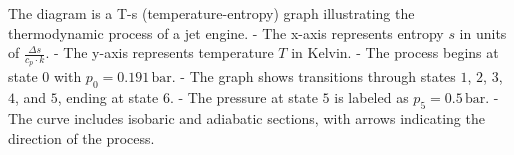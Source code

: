 The diagram is a T-s (temperature-entropy) graph illustrating the thermodynamic process of a jet engine.  
- The x-axis represents entropy \( s \) in units of \( \frac{\Delta s}{c_p \cdot k} \).  
- The y-axis represents temperature \( T \) in Kelvin.  
- The process begins at state \( 0 \) with \( p_0 = 0.191 \, \text{bar} \).  
- The graph shows transitions through states \( 1 \), \( 2 \), \( 3 \), \( 4 \), and \( 5 \), ending at state \( 6 \).  
- The pressure at state \( 5 \) is labeled as \( p_5 = 0.5 \, \text{bar} \).  
- The curve includes isobaric and adiabatic sections, with arrows indicating the direction of the process.